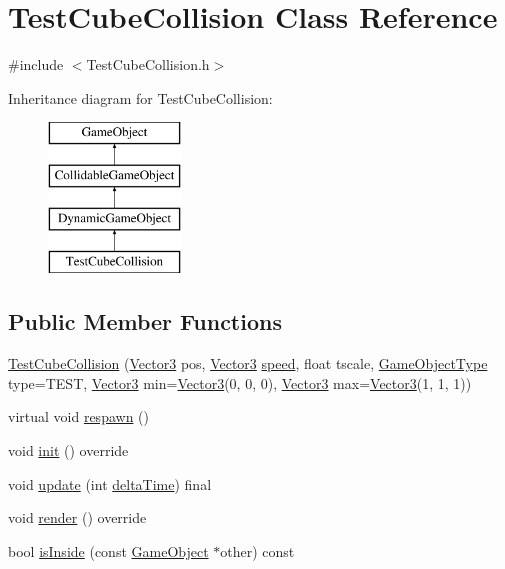 \hypertarget{class_test_cube_collision}{}\section{Test\+Cube\+Collision Class Reference}
\label{class_test_cube_collision}


{\ttfamily \#include $<$Test\+Cube\+Collision.\+h$>$}

Inheritance diagram for Test\+Cube\+Collision\+:\begin{figure}[H]
\begin{center}
\leavevmode
\includegraphics[height=4.000000cm]{class_test_cube_collision}
\end{center}
\end{figure}
\subsection*{Public Member Functions}
\begin{DoxyCompactItemize}
\item 
\hyperlink{class_test_cube_collision_a512c666b3899713b54b096e3e5ab5e58}{Test\+Cube\+Collision} (\hyperlink{class_vector3}{Vector3} pos, \hyperlink{class_vector3}{Vector3} \hyperlink{class_dynamic_game_object_a54cb8a3a5fe8314cd5751f223b2b49ae}{speed}, float tscale, \hyperlink{_game_object_8h_a57678b60d65afb213d04a6b090c64a08}{Game\+Object\+Type} type=T\+E\+ST, \hyperlink{class_vector3}{Vector3} min=\hyperlink{class_vector3}{Vector3}(0, 0, 0), \hyperlink{class_vector3}{Vector3} max=\hyperlink{class_vector3}{Vector3}(1, 1, 1))
\item 
virtual void \hyperlink{class_test_cube_collision_a796cf89af42a38b44956f753e14637b2}{respawn} ()
\item 
void \hyperlink{class_test_cube_collision_a22fade1ca48a2cd49dd4ca6cbc93821b}{init} () override
\item 
void \hyperlink{class_test_cube_collision_ae528ac632377372d93964c938748fddf}{update} (int \hyperlink{_game_manager_8h_afea6a95c7a1c119b7106a4c735eb259d}{delta\+Time}) final
\item 
void \hyperlink{class_test_cube_collision_ae5cd1052745d6acf9cbb2a6bde8b757a}{render} () override
\item 
bool \hyperlink{class_test_cube_collision_a94a32ad4ffd215b7c16efa866eb31ef2}{is\+Inside} (const \hyperlink{class_game_object}{Game\+Object} $\ast$other) const
\end{DoxyCompactItemize}
